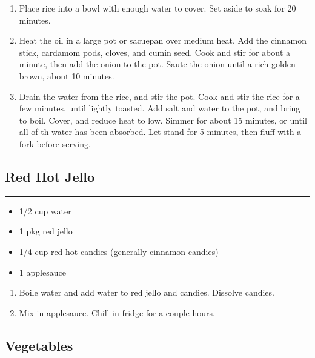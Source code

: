 \documentclass{article}
\begin{document}
\begin{enumerate}
    \item 
        Place rice into a bowl with enough water to cover. Set aside to soak for 20 minutes.
    \item 
        Heat the oil in a large pot or sacuepan over medium heat. Add the cinnamon stick, cardamom pods, cloves, and cumin seed. Cook and stir for about a minute, then add the onion to the pot. Saute the onion until a rich golden brown, about 10 minutes.
    \item 
        Drain the water from the rice, and stir the pot. Cook and stir the rice for a few minutes, until lightly toasted. Add salt and water to the pot, and bring to boil. Cover, and reduce heat to low. Simmer for about 15 minutes, or until all of th water has been absorbed. Let stand for 5 minutes, then fluff with a fork before serving.
\end{enumerate}
\newpage

\subsection{Red Hot Jello} 
\noindent\rule[0.5ex]{\linewidth}{1pt}

\begin{framed}
    \begin{itemize}
        \item 1/2 cup water
        \item 1 pkg red jello 
        \item 1/4 cup red hot candies (generally cinnamon candies)
        \item 1 applesauce
    \end{itemize}
\end{framed}

\begin{enumerate}
    \item 
        Boile water and add water to red jello and candies. Dissolve candies.
    \item 
        Mix in applesauce. Chill in fridge for a couple hours.
\end{enumerate}
\newpage

\vspace*{\fill}
\begin{center}
    \section{Vegetables}
\end{center}
\vspace*{\fill}
\newpage 
\end{document}
